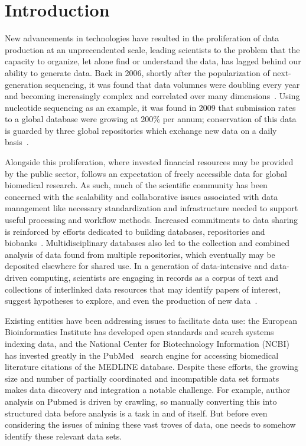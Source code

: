 \section{Introduction}
New advancements in technologies have resulted in the proliferation of data production at an unprecendented scale, leading scientists to the problem that the capacity to organize, let alone find or understand the data, has lagged behind our ability to generate data. Back in 2006, shortly after the popularization of next-generation sequencing, it was found that data volumnes were doubling every year and becoming increasingly complex and correlated over many dimensions~\cite{szalay20062020}. Using nucleotide sequencing as an example, it was found in 2009 that submission rates to a global database were growing at 200\% per annum; conservation of this data is guarded by three global repositories which exchange new data on a daily basis~\cite{southan2009beyond}.

Alongside this proliferation, where invested financial resources may be provided by the public sector, follows an expectation of freely accessible data for global biomedical research. As such, much of the scientific community has been concerned with the scalability and collaborative issues associated with data management like necessary standardization and infrastructure needed to support useful processing and workflow methods. Increased commitments to data sharing is reinforced by efforts dedicated to building databases, repositories and biobanks~\cite{leonelli2012introduction}. Multidisciplinary databases also led to the collection and combined analysis of data found from multiple repositories, which eventually may be deposited elsewhere for shared use. In a generation of data-intensive and data-driven computing, scientists are engaging in records as a corpus of text and collections of interlinked data resources that may identify papers of interest, suggest hypotheses to explore, and even the production of new data~\cite{lynch2009jim}.

Existing entities have been addressing issues to facilitate data use: the European Bioinformatics Institute has developed open standards and search systems indexing data, and the National Center for Biotechnology Information (NCBI) has invested greatly in the PubMed~\cite{pubmed} search engine for accessing biomedical literature citations of the MEDLINE database. Despite these efforts, the growing size and number of partially coordinated and incompatible data set formats makes data discovery and integration a notable challenge. For example, author analysis on Pubmed is driven by crawling, so manually converting this into structured data before analysis is a task in and of itself. But before even considering the issues of mining these vast troves of data, one needs to somehow identify these relevant data sets.


